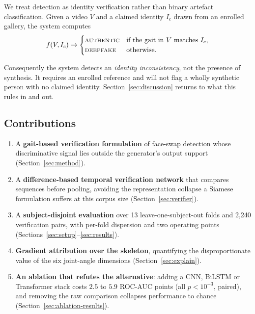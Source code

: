 \documentclass[conference]{IEEEtran}
\begin{document}
We treat detection as identity verification rather than binary artefact
classification. Given a video $V$ and a claimed identity $I_c$ drawn from an
enrolled gallery, the system computes
\begin{equation}
f(V, I_c) \rightarrow
\begin{cases}
\textsc{authentic} & \text{if the gait in } V \text{ matches } I_c,\\
\textsc{deepfake}  & \text{otherwise.}
\end{cases}
\label{eq:problem}
\end{equation}

Consequently the system detects an \emph{identity inconsistency}, not the
presence of synthesis. It
requires an enrolled reference and will not flag a wholly synthetic person with
no claimed identity. Section~\ref{sec:discussion} returns to what this rules in
and out.

\subsection{Contributions}

\begin{enumerate}
\item A \textbf{gait-based verification formulation} of face-swap detection
      whose discriminative signal lies outside the generator's output support
      (Section~\ref{sec:method}).
\item A \textbf{difference-based temporal verification network} that compares
      sequences before pooling, avoiding the representation collapse a Siamese
      formulation suffers at this corpus size (Section~\ref{sec:verifier}).
\item A \textbf{subject-disjoint evaluation} over 13 leave-one-subject-out
      folds and 2{,}240 verification pairs, with per-fold dispersion and two
      operating points (Sections~\ref{sec:setup}--\ref{sec:results}).
\item \textbf{Gradient attribution over the skeleton}, quantifying the
      disproportionate value of the six joint-angle dimensions
      (Section~\ref{sec:explain}).
\item \textbf{An ablation that refutes the alternative}: adding a CNN, BiLSTM or
      Transformer stack costs $2.5$ to $5.9$ ROC-AUC points (all
      $p < 10^{-3}$, paired), and removing the raw comparison collapses
      performance to chance (Section~\ref{sec:ablation-results}).
\end{enumerate}
\end{document}
